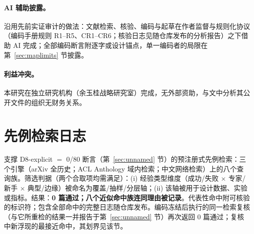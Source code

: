 \documentclass[10pt,fontset=fandol]{ctexart}
\begin{document}
\paragraph{AI 辅助披露。}
沿用先前实证审计的做法：文献检索、核验、编码与起草在作者监督与规则化协议（编码手册规则 R1--R5、CR1--CR6；核验日志见随仓库发布的分析报告）之下借助 AI 完成；全部编码断言附逐字或设计锚点，单一编码者的局限在第~\ref{sec:maplimits} 节披露。

\paragraph{利益冲突。}
本研究在独立研究机构（余玉桂战略研究室）完成，无外部资助，与文中分析其公开文件的组织无财务关系。

\appendix

\section{先例检索日志}\label{sec:appendix-absence}

支撑 D8-explicit $=$ 0/80 断言（第~\ref{sec:unnamed} 节）的预注册式先例检索：三个引擎（arXiv 全历史；ACL Anthology 域内检索；中文网络检索）上的八个查询族。筛选判据（两个合取项均需满足）：(i) 经验类型维度（成功/失败 $\times$ 专家/新手 $\times$ 典型/边缘）被命名为覆盖/抽样/分层轴；(ii) 该轴被用于设计数据、实验或指标。结果：\textbf{0 篇通过；八个近似命中族连同理由被记录}。代表性命中附可核验的标识符；包含全部命中的完整日志随仓库发布。编码冻结后执行的同一检索复核（与它所重检的结果一并报告于第~\ref{sec:unnamed} 节）再次返回 0 篇通过；复核中新浮现的最接近命中，其划界见该节。
\end{document}
